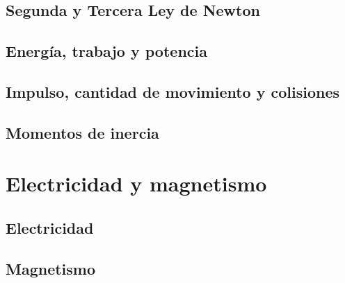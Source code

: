 \documentclass{AsignaturaResumen}
\begin{document}
    \chapter{Segunda y Tercera Ley de Newton} 
    \chapter{Energía, trabajo y potencia} 
    \chapter{Impulso, cantidad de movimiento y colisiones} 
    \chapter{Momentos de inercia} 

\part{Electricidad y magnetismo}

    \chapter{Electricidad} 
    \chapter{Magnetismo} 


    \appendix{}

    \backmatter
    
\end{document}
